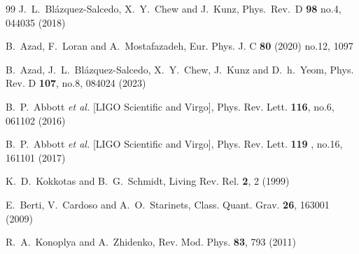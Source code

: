 \documentclass{article}
\begin{document}
\begin{small}
\begin{thebibliography}{99}
  J.~L.~Bl\'{a}zquez-Salcedo, X.~Y.~Chew and J.~Kunz,
  Phys.\ Rev.\ D {\bf 98} no.4,  044035 (2018)

B.~Azad, F.~Loran and A.~Mostafazadeh,
Eur. Phys. J. C \textbf{80} (2020) no.12, 1097

B.~Azad, J.~L.~Bl\'azquez-Salcedo, X.~Y.~Chew, J.~Kunz and D.~h.~Yeom,
Phys. Rev. D \textbf{107}, no.8, 084024 (2023)

B.~P.~Abbott \textit{et al.} [LIGO Scientific and Virgo],
Phys. Rev. Lett. \textbf{116}, no.6, 061102 (2016)

B.~P.~Abbott \textit{et al.} [LIGO Scientific and Virgo],
Phys. Rev. Lett. \textbf{119} , no.16, 161101 (2017)

K.~D.~Kokkotas and B.~G.~Schmidt,
Living Rev. Rel. \textbf{2}, 2 (1999)

E.~Berti, V.~Cardoso and A.~O.~Starinets,
Class. Quant. Grav. \textbf{26}, 163001 (2009)

R.~A.~Konoplya and A.~Zhidenko,
Rev. Mod. Phys. \textbf{83}, 793 (2011)



\end{thebibliography}
\end{small}
\end{document}
